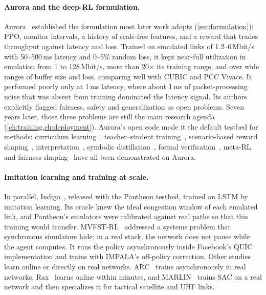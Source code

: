 \paragraph{Aurora and the deep-RL formulation.} Aurora~\cite{jay2019aurora} established the formulation most later work adopts (\cref{sec:formulation}): PPO, monitor intervals, a history of scale-free features, and a reward that trades throughput against latency and loss. Trained on simulated links of 1.2--6\,Mbit/s with 50--500\,ms latency and 0--5\% random loss, it kept near-full utilization in emulation from 1 to 128\,Mbit/s, more than 20$\times$ its training range, and over wide ranges of buffer size and loss, comparing well with CUBIC and PCC Vivace. It performed poorly only at 1\,ms latency, where about 1\,ms of packet-processing noise that was absent from training dominated the latency signal. Its authors explicitly flagged fairness, safety and generalization as open problems. Seven years later, those three problems are still the main research agenda (\cref{ch:training,ch:deployment}). Aurora's open code made it the default testbed for methods: curriculum learning~\cite{xia2022genet}, teacher--student training~\cite{zheng2022teacher}, scenario-based reward shaping~\cite{yerushalmi2023enhancing}, interpretation~\cite{meng2020interpreting}, symbolic distillation~\cite{sharan2022symbolic}, formal verification~\cite{kazak2019verily,eliyahu2021whirl,amir2024verifying}, meta-RL~\cite{mwaura2025adaptive} and fairness shaping~\cite{mbrice2026fair} have all been demonstrated on Aurora.

\paragraph{Imitation learning and training at scale.} In parallel, Indigo~\cite{yan2018pantheon}, released with the Pantheon testbed, trained an LSTM by imitation learning. Its oracle knew the ideal congestion window of each emulated link, and Pantheon's emulators were calibrated against real paths so that this training would transfer. MVFST-RL~\cite{sivakumar2019mvfst} addressed a systems problem that synchronous simulators hide: in a real stack, the network does not pause while the agent computes. It runs the policy asynchronously inside Facebook's QUIC implementation and trains with IMPALA's off-policy correction. Other studies learn online or directly on real networks. ARC~\cite{zhang2020reinforcement} trains asynchronously in real networks, Rax~\cite{bachl2019rax} learns online within minutes, and MARLIN~\cite{galliera2023marlin} trains SAC on a real network and then specializes it for tactical satellite and UHF links.

